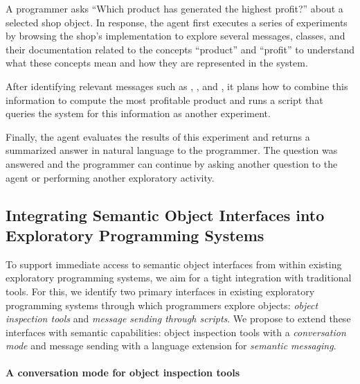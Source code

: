 \begin{example}
	A programmer asks ``Which product has generated the highest profit?'' about a selected shop object.
	In response, the agent first executes a series of experiments by browsing the shop's implementation to explore several messages, classes, and their documentation related to the concepts ``product'' and ``profit'' to understand what these concepts mean and how they are represented in the system.

	After identifying relevant messages such as , , and , it plans how to combine this information to compute the most profitable product and runs a script that queries the system for this information as another experiment.

	Finally, the agent evaluates the results of this experiment and returns a summarized answer in natural language to the programmer.
	The question was answered and the programmer can continue by asking another question to the agent or performing another exploratory activity.
\end{example}

\subsection*{Integrating Semantic Object Interfaces into Exploratory Programming Systems}
\label{sec:design/agent/interfaces}

To support immediate access to semantic object interfaces from within existing exploratory programming systems, we aim for a tight integration with traditional tools.
For this, we identify two primary interfaces in existing exploratory programming systems through which programmers explore objects: \emph{object inspection tools} and \emph{message sending through scripts}.
We propose to extend these interfaces with semantic capabilities: object inspection tools with a \emph{conversation mode} and message sending with a language extension for \emph{semantic messaging}.

\paragraph{A conversation mode for object inspection tools}
\label{par:design/agent/interfaces/inspector}

